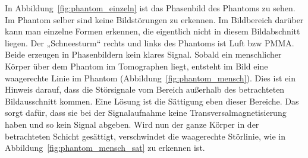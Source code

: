 \documentclass[
    11pt,
    ngerman
]{scrreprt}
\begin{document}
In Abbildung~\ref{fig:phantom_einzeln} ist das Phasenbild des Phantoms zu
sehen. Im Phantom selber sind keine Bildstörungen zu erkennen. Im Bildbereich
darüber kann man einzelne Formen erkennen, die eigentlich nicht in diesem
Bildabschnitt liegen. Der „Schneesturm“ rechts und links des Phantoms ist Luft
bzw PMMA. Beide erzeugen in Phasenbildern kein klares Signal. Sobald ein
menschlicher Körper über dem Phantom im Tomographen liegt, entsteht im Bild
eine waagerechte Linie im Phantom (Abbildung~\ref{fig:phantom_mensch}). Dies
ist ein Hinweis darauf, dass die Störsignale vom Bereich außerhalb des
betrachteten Bildausschnitt kommen. Eine Lösung ist die Sättigung eben dieser
Bereiche. Das sorgt dafür, dass sie bei der Signalaufnahme keine
Transversalmagnetisierung haben und so kein Signal abgeben. Wird nun der ganze
Körper in der betrachteten Schicht gesättigt, verschwindet die waagerechte
Störlinie, wie in Abbildung~\ref{fig:phantom_mensch_sat} zu erkennen ist.
\end{document}
